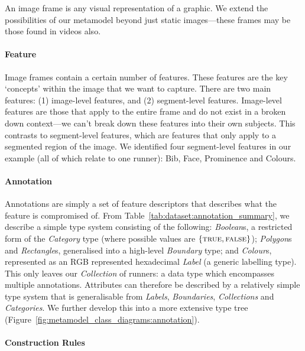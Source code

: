 An image frame is any visual representation of a graphic. We extend the possibilities of our metamodel beyond just static images---these frames may be those found in videos also.

\paragraph{Feature}

Image frames contain a certain number of features. These features are the key `concepts' within the image that we want to capture. There are two main features: (1) image-level features, and (2) segment-level features. Image-level features are those that apply to the entire frame and do not exist in a broken down context---we can't break down these features into their own subjects. This contrasts to segment-level features, which are features that only apply to a segmented region of the image. We identified four segment-level features in our example (all of which relate to one runner): Bib, Face, Prominence and Colours.


\paragraph{Annotation}

Annotations are simply a set of feature descriptors that describes what the feature is compromised of. From Table~\ref{tab:dataset:annotation_summary}, we describe a simple type system consisting of the following: \textit{Boolean}s, a restricted form of the \textit{Category} type (where possible values are $\{ \textsc{true}, \textsc{false} \}$); \textit{Polygon}s and \textit{Rectangle}s, generalised into a high-level \textit{Boundary} type; and \textit{Colour}s, represented as an RGB represented hexadecimal \textit{Label} (a generic labelling type). This only leaves our \textit{Collection} of runners: a data type which encompasses multiple annotations. Attributes can therefore be described by a relatively simple type system that is generalisable from \textit{Labels}, \textit{Boundaries}, \textit{Collections} and \textit{Categories}. We further develop this into a more extensive type tree (Figure~\ref{fig:metamodel_class_diagrams:annotation}).

\paragraph{Construction Rules} 


